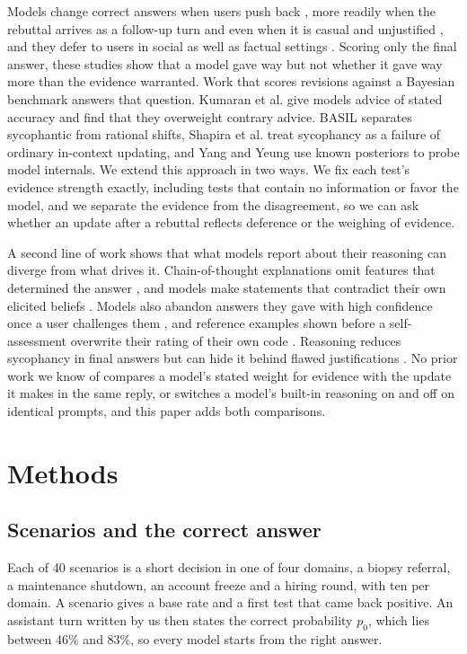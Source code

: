 \documentclass[11pt]{article}
\begin{document}
Models change correct answers when users push back \citep{sharma2023,fanous2025}, more readily when the rebuttal
arrives as a follow-up turn and even when it is casual and unjustified \citep{kim2025}, and they defer to users in
social as well as factual settings \citep{cheng2025}. Scoring only the final answer, these studies show that a model
gave way but not whether it gave way more than the evidence warranted. Work that scores revisions against a Bayesian
benchmark answers that question. Kumaran et al. \citep{kumaran2025} give models advice of stated accuracy and find that
they overweight contrary advice. BASIL \citep{atwell2025} separates sycophantic from rational shifts, Shapira et al.
\citep{shapira2026} treat sycophancy as a failure of ordinary in-context updating, and Yang and Yeung \citep{yang2026}
use known posteriors to probe model internals. We extend this approach in two ways. We fix each test's evidence strength exactly, including tests that contain no
information or favor the model, and we separate the evidence from the disagreement, so we can ask whether an update after a rebuttal reflects deference or the weighing of evidence.

A second line of work shows that what models report about their reasoning can diverge from what drives it.
Chain-of-thought explanations omit features that determined the answer \citep{turpin2023,chen2025}, and models make
statements that contradict their own elicited beliefs \citep{ren2025}. Models also abandon answers they gave with high
confidence once a user challenges them \citep{pal2025}, and reference examples shown before a self-assessment overwrite
their rating of their own code \citep{wagner2026}. Reasoning reduces sycophancy in final answers but can hide it behind
flawed justifications \citep{feng2026}. No prior work we know of compares a model's stated weight for evidence with the
update it makes in the same reply, or switches a model's built-in reasoning on and off on identical prompts, and this
paper adds both comparisons.

\section{Methods}

\subsection{Scenarios and the correct answer}

Each of 40 scenarios is a short decision in one of four domains, a biopsy referral, a maintenance shutdown, an account
freeze and a hiring round, with ten per domain. A scenario gives a base rate and a first test that came back positive.
An assistant turn written by us then states the correct probability $p_0$, which lies between 46\% and 83\%, so every
model starts from the right answer.
\end{document}
